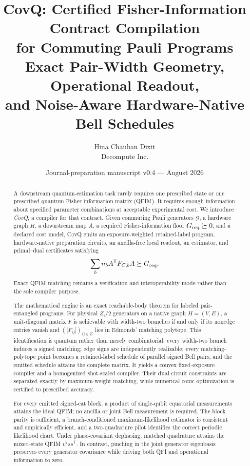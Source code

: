 \documentclass[11pt]{article}
\title{\textbf{CovQ: Certified Fisher-Information Contract Compilation\\for Commuting Pauli Programs}\\[0.35em]
\large Exact Pair-Width Geometry, Operational Readout,\\and Noise-Aware Hardware-Native Bell Schedules}
\author{Hina Chauhan Dixit\\Decompute Inc.}
\date{Journal-preparation manuscript v0.4 --- August 2026}
\theoremstyle{definition}
\theoremstyle{remark}
\newcommand{\G}{\mathcal{G}}
\begin{document}
\maketitle

\begin{abstract}
A downstream quantum-estimation task rarely requires one prescribed state or one prescribed quantum Fisher information matrix (QFIM). It requires enough information about specified parameter combinations at acceptable experimental cost. We introduce \emph{CovQ}, a compiler for that contract. Given commuting Pauli generators $\G$, a hardware graph $H$, a downstream map $A$, a required Fisher-information floor $G_{\rm req}\succeq0$, and a declared cost model, CovQ emits an exposure-weighted retained-label program, hardware-native preparation circuits, an ancilla-free local readout, an estimator, and primal--dual certificates satisfying
\[
  \sum_b n_b A^{\mathsf T}F_{C,b}A\succeq G_{\rm req}.
\]
Exact QFIM matching remains a verification and interoperability mode rather than the sole compiler purpose.

The mathematical engine is an exact reachable-body theorem for labeled pair-entangled programs. For physical $Z_i/2$ generators on a native graph $H=(V,E)$, a unit-diagonal matrix $F$ is achievable with width-two branches if and only if its nonedge entries vanish and $(|F_{ij}|)_{ij\in E}$ lies in Edmonds' matching polytope. This identification is quantum rather than merely combinatorial: every width-two branch induces a signed matching; edge signs are independently realizable; every matching-polytope point becomes a retained-label schedule of parallel signed Bell pairs; and the emitted schedule attains the complete matrix. It yields a convex fixed-exposure compiler and a homogenized shot-scaled compiler. Their dual circuit constraints are separated exactly by maximum-weight matching, while numerical conic optimization is certified to prescribed accuracy.

For every emitted signed-cat block, a product of single-qubit equatorial measurements attains the ideal QFIM; no ancilla or joint Bell measurement is required. The block parity is sufficient, a branch-conditioned maximum-likelihood estimator is consistent and empirically efficient, and a two-quadrature pilot identifies the correct periodic likelihood chart. Under phase-covariant dephasing, matched quadrature attains the mixed-state QFIM $v^2ss^{\mathsf T}$. In contrast, pinching in the joint generator eigenbasis preserves every generator covariance while driving both QFI and operational information to zero.


\end{abstract}
\end{document}
